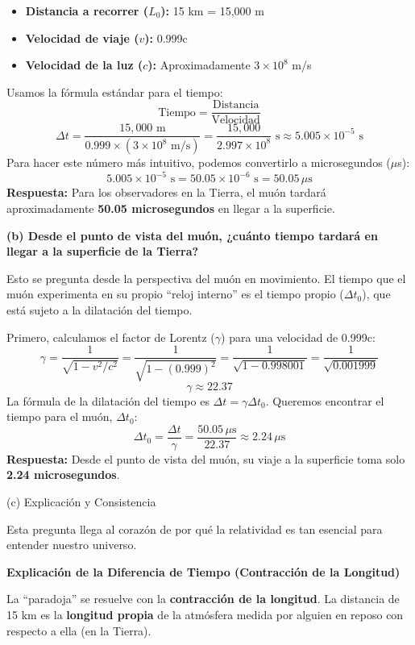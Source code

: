 \documentclass[11pt,a4paper]{book}
\begin{document}
\begin{enumerate}
\begin{itemize}
\begin{itemize}
    \item \textbf{Distancia a recorrer ($L_0$):} 15 km = 15,000 m
    \item \textbf{Velocidad de viaje ($v$):} 0.999c
    \item \textbf{Velocidad de la luz ($c$):} Aproximadamente $3 \times 10^8$ m/s
\end{itemize}
Usamos la fórmula estándar para el tiempo:
\[ \text{Tiempo} = \frac{\text{Distancia}}{\text{Velocidad}} \]
\[ \Delta t = \frac{15,000 \text{ m}}{0.999 \times (3 \times 10^8 \text{ m/s})} = \frac{15,000}{2.997 \times 10^8} \text{ s} \approx 5.005 \times 10^{-5} \text{ s} \]
Para hacer este número más intuitivo, podemos convertirlo a microsegundos ($\mu$s):
\[ 5.005 \times 10^{-5} \text{ s} = 50.05 \times 10^{-6} \text{ s} = 50.05 \, \mu\text{s} \]
\textbf{Respuesta:} Para los observadores en la Tierra, el muón tardará aproximadamente \textbf{50.05 microsegundos} en llegar a la superficie.

\textbf{(b) Desde el punto de vista del muón, ¿cuánto tiempo tardará en llegar a la superficie de la Tierra?}

Esto se pregunta desde la perspectiva del muón en movimiento. El tiempo que el muón experimenta en su propio ``reloj interno'' es el tiempo propio ($\Delta t_0$), que está sujeto a la dilatación del tiempo.

Primero, calculamos el factor de Lorentz ($\gamma$) para una velocidad de 0.999c:
\[ \gamma = \frac{1}{\sqrt{1 - v^2/c^2}} = \frac{1}{\sqrt{1 - (0.999)^2}} = \frac{1}{\sqrt{1 - 0.998001}} = \frac{1}{\sqrt{0.001999}} \]
\[ \gamma \approx 22.37 \]
La fórmula de la dilatación del tiempo es $\Delta t = \gamma \Delta t_0$. Queremos encontrar el tiempo para el muón, $\Delta t_0$:
\[ \Delta t_0 = \frac{\Delta t}{\gamma} = \frac{50.05 \, \mu\text{s}}{22.37} \approx 2.24 \, \mu\text{s} \]
\textbf{Respuesta:} Desde el punto de vista del muón, su viaje a la superficie toma solo \textbf{2.24 microsegundos}.

\textbf{}{(c) Explicación y Consistencia}

Esta pregunta llega al corazón de por qué la relatividad es tan esencial para entender nuestro universo.

\textbf{Explicación de la Diferencia de Tiempo (Contracción de la Longitud)}

La ``paradoja'' se resuelve con la \textbf{contracción de la longitud}. La distancia de 15 km es la \textbf{longitud propia} de la atmósfera medida por alguien en reposo con respecto a ella (en la Tierra).


\end{itemize}
\end{enumerate}
\end{document}
